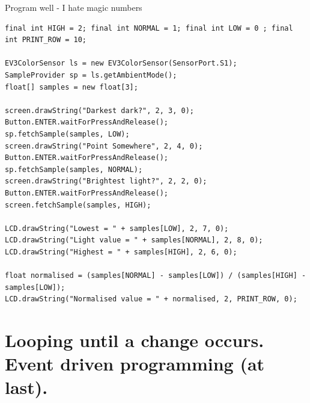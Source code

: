 \documentclass[color=pdftex,usenames,dvipsnames, aspectratio=169]{beamer}
\begin{document}
\begin{frame}{Program well - I hate magic numbers}
\begin{lstlisting}[basicstyle=\ttfamily\scriptsize\color{blue}]
final int HIGH = 2; final int NORMAL = 1; final int LOW = 0 ; final int PRINT_ROW = 10;

EV3ColorSensor ls = new EV3ColorSensor(SensorPort.S1);
SampleProvider sp = ls.getAmbientMode();
float[] samples = new float[3];

screen.drawString("Darkest dark?", 2, 3, 0); Button.ENTER.waitForPressAndRelease();
sp.fetchSample(samples, LOW);
screen.drawString("Point Somewhere", 2, 4, 0); Button.ENTER.waitForPressAndRelease();
sp.fetchSample(samples, NORMAL);
screen.drawString("Brightest light?", 2, 2, 0); Button.ENTER.waitForPressAndRelease();
screen.fetchSample(samples, HIGH);

LCD.drawString("Lowest = " + samples[LOW], 2, 7, 0);
LCD.drawString("Light value = " + samples[NORMAL], 2, 8, 0);
LCD.drawString("Highest = " + samples[HIGH], 2, 6, 0);

float normalised = (samples[NORMAL] - samples[LOW]) / (samples[HIGH] - samples[LOW]);
LCD.drawString("Normalised value = " + normalised, 2, PRINT_ROW, 0);
\end{lstlisting}
\end{frame}




\section{Looping until a change occurs.\\ Event driven programming (at last).}
\end{document}
